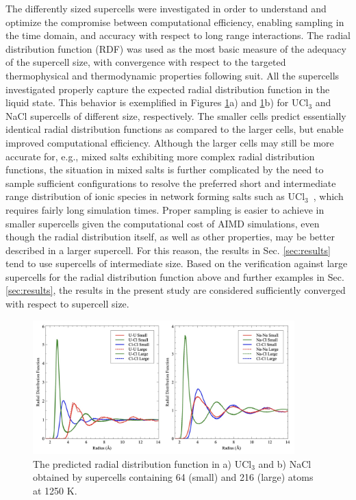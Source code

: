 \documentclass[preprint,3p,10pt,onecolumn,number,sort&compress]{elsarticle}
\begin{document}
The differently sized supercells were investigated in order to understand and optimize the compromise between computational efficiency, enabling sampling in the time domain, and accuracy with respect to long range interactions. The radial distribution function (RDF) was used as the most basic measure of the adequacy of the supercell size, with convergence with respect to the targeted thermophysical and thermodynamic properties following suit. All the supercells investigated properly capture the expected radial distribution function in the liquid state. This behavior is exemplified in Figures \ref{fig:radial}a) and \ref{fig:radial}b) for UCl$_3$ and NaCl supercells of different size, respectively. The smaller cells predict essentially identical radial distribution functions as compared to the larger cells, but enable improved computational efficiency. Although the larger cells may still be more accurate for, e.g., mixed salts exhibiting more complex radial distribution functions, the situation in mixed salts is further complicated by the need to sample sufficient configurations to resolve the preferred short and intermediate range distribution of ionic species in network forming salts such as UCl$_3$~\cite{Li}, which requires fairly long simulation times. Proper sampling is easier to achieve in smaller supercells given the computational cost of AIMD simulations, even though the radial distribution itself, as well as other properties, may be better described in a larger supercell. For this reason, the results in Sec. \ref{sec:results} tend to use supercells of intermediate size.  Based on the verification against large supercells for the radial distribution function above and further examples in Sec. \ref{sec:results}, the results in the present study are considered sufficiently converged with respect to supercell size.

\begin{figure}[htb]
\centering
\includegraphics[width=0.9\textwidth]{fig1.jpg}
\caption{The predicted radial distribution function in a) UCl$_3$ and b) NaCl obtained by supercells containing 64 (small) and 216 (large) atoms at 1250 K.} 
\label{fig:radial}
\end{figure}
\end{document}
